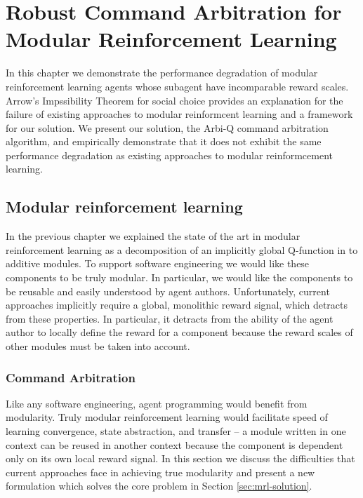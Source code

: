 \chapter{Robust Command Arbitration for Modular Reinforcement Learning}\label{ch:arbiq}

In this chapter we demonstrate the performance degradation of modular reinforcement learning agents whose subagent have incomparable reward scales. Arrow's Impssibility Theorem for social choice provides an explanation for the failure of existing approaches to modular reinformcent learning and a framework for our solution. We present our solution, the Arbi-Q command arbitration algorithm, and empirically demonstrate that it does not exhibit the same performance degradation as existing approaches to modular reinformcement learning.

\section{Modular reinforcement learning}

In the previous chapter we explained the state of the art in modular reinforcement learning as a decomposition of an implicitly global Q-function in to additive modules. To support software engineering we would like these components to be truly modular. In particular, we would like the components to be reusable and easily understood by agent authors.  Unfortunately, current approaches implicitly require a global, monolithic reward signal, which detracts from these properties.  In particular, it detracts from the ability of the agent author to locally define the reward for a component because the reward scales of other modules must be taken into account.

\subsection{Command Arbitration}

Like any software engineering, agent programming would benefit from modularity.  Truly modular reinforcement learning would facilitate speed of learning convergence, state abstraction, and transfer -- a module written in one context can be reused in another context because the component is dependent only on its own local reward signal.  In this section we discuss the difficulties that current approaches face in achieving true modularity and present a new formulation which solves the core problem in Section \ref{sec:mrl-solution}.

